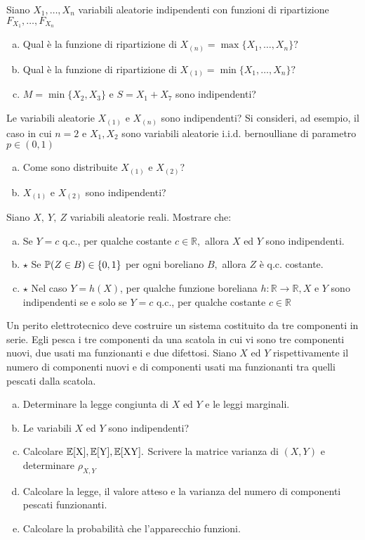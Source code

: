 \Esercizio{}

Siano $X_{1} ,\dots ,X_{n}$ variabili aleatorie indipendenti con funzioni di ripartizione $F_{X_{1}} ,\dots ,F_{X_{n}}$
\begin{enumerate}[a)]
	\item Qual è la funzione di ripartizione di $X_{(n)} =\max\{X_{1} ,\dots ,X_{n}\} ?$
	\item Qual è la funzione di ripartizione di $X_{(1)} =\min\{X_{1} ,\dots ,X_{n}\} ?$
	\item $M=\min\{X_{2} ,X_{3}\}$ e $S=X_{1} +X_{7}$ sono indipendenti?
\end{enumerate}

Le variabili aleatorie $X_{(1)}$ e $X_{(n)}$ sono indipendenti? Si consideri, ad esempio, il caso in cui $n=2$ e $X_{1} ,X_{2}$ sono variabili aleatorie i.i.d. bernoulliane di parametro $p\in (0,1)$

\begin{enumerate}[a),resume]
	\item Come sono distribuite $X_{(1)}$ e $X_{(2)}$?
	\item $X_{(1)}$ e $X_{(2)}$ sono indipendenti?
\end{enumerate}

\Esercizio{}

Siano $X,\ Y,\ Z$ variabili aleatorie reali. Mostrare che:
\begin{enumerate}[a)]
	\item Se $Y=c$ q.c., per qualche costante $c\in \mathbb{R} ,$ allora $X$ ed $Y$ sono indipendenti.
	\item $\star$ Se $\mathbb{P} (Z\in B)\in \{0,1\}$ per ogni boreliano $B,$ allora $Z$ è q.c. costante.
	\item $\star$ Nel caso $Y=h(X)$, per qualche funzione boreliana $h:\mathbb{R}\rightarrow \mathbb{R} ,X$ e $Y$ sono indipendenti se e solo se $Y=c$ q.c., per qualche costante $c\in \mathbb{R}$
\end{enumerate}

\Esercizio{}

Un perito elettrotecnico deve costruire un sistema costituito da tre componenti in serie. Egli pesca i tre componenti da una scatola in cui vi sono tre componenti nuovi, due usati ma funzionanti e due difettosi. Siano $X$ ed $Y$ rispettivamente il numero di componenti nuovi e di componenti usati ma funzionanti tra quelli pescati dalla scatola.

\begin{enumerate}[a)]
	\item Determinare la legge congiunta di $X$ ed $Y$ e le leggi marginali.
	\item Le variabili $X$ ed $Y$ sono indipendenti?
	\item Calcolare $\mathbb{E}[\mathrm{X}],\mathbb{E}[\mathrm{Y}],\mathbb{E}[\mathrm{XY}].$ Scrivere la matrice varianza di $(X,Y)$ e determinare $\rho_{X,Y}$
	\item Calcolare la legge, il valore atteso e la varianza del numero di componenti pescati funzionanti.
	\item Calcolare la probabilità che l'apparecchio funzioni.
\end{enumerate}


